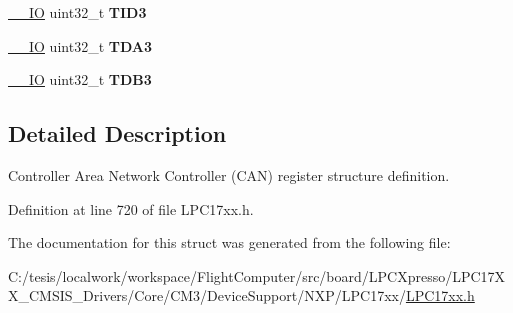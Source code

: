\begin{DoxyCompactItemize}
\item 
\hypertarget{struct_l_p_c___c_a_n___type_def_a8ad7b5ae2f928f189fea5f021789e1e2}{\hyperlink{group___c_m_s_i_s__core__definitions_gaec43007d9998a0a0e01faede4133d6be}{\-\_\-\-\_\-\-I\-O} uint32\-\_\-t {\bfseries \-T\-I\-D3}}\label{struct_l_p_c___c_a_n___type_def_a8ad7b5ae2f928f189fea5f021789e1e2}

\item 
\hypertarget{struct_l_p_c___c_a_n___type_def_a4700b9e9bb0a2f5230fe59e27746038f}{\hyperlink{group___c_m_s_i_s__core__definitions_gaec43007d9998a0a0e01faede4133d6be}{\-\_\-\-\_\-\-I\-O} uint32\-\_\-t {\bfseries \-T\-D\-A3}}\label{struct_l_p_c___c_a_n___type_def_a4700b9e9bb0a2f5230fe59e27746038f}

\item 
\hypertarget{struct_l_p_c___c_a_n___type_def_aeb52795fc9c58e15fc05c7fe43faab4f}{\hyperlink{group___c_m_s_i_s__core__definitions_gaec43007d9998a0a0e01faede4133d6be}{\-\_\-\-\_\-\-I\-O} uint32\-\_\-t {\bfseries \-T\-D\-B3}}\label{struct_l_p_c___c_a_n___type_def_aeb52795fc9c58e15fc05c7fe43faab4f}

\end{DoxyCompactItemize}


\subsection{\-Detailed \-Description}
\-Controller \-Area \-Network \-Controller (\-C\-A\-N) register structure definition. 

\-Definition at line 720 of file \-L\-P\-C17xx.\-h.



\-The documentation for this struct was generated from the following file\-:\begin{DoxyCompactItemize}
\item 
\-C\-:/tesis/localwork/workspace/\-Flight\-Computer/src/board/\-L\-P\-C\-Xpresso/\-L\-P\-C17\-X\-X\-\_\-\-C\-M\-S\-I\-S\-\_\-\-Drivers/\-Core/\-C\-M3/\-Device\-Support/\-N\-X\-P/\-L\-P\-C17xx/\hyperlink{_l_p_c17xx_8h}{\-L\-P\-C17xx.\-h}\end{DoxyCompactItemize}
